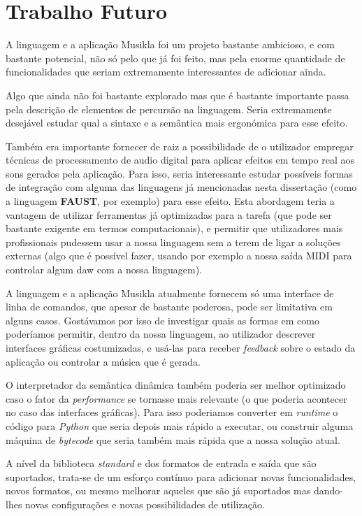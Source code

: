 \section{Trabalho Futuro}
A linguagem e a aplicação Musikla foi um projeto bastante ambicioso, e com bastante potencial, não só pelo que já foi feito, mas pela enorme quantidade de funcionalidades que seriam extremamente interessantes de adicionar ainda.

Algo que ainda não foi bastante explorado mas que é bastante importante passa pela descrição de elementos de percursão na linguagem. Seria extremamente desejável estudar qual a sintaxe e a semântica mais ergonómica para esse efeito.

Também era importante fornecer de raiz a possibilidade de o utilizador empregar técnicas de processamento de audio digital para aplicar efeitos em tempo real aos sons gerados pela aplicação. Para isso, seria interessante estudar possíveis formas de integração com alguma das linguagens já mencionadas nesta dissertação (como a linguagem \textbf{FAUST}, por exemplo) para esse efeito. Esta abordagem teria a vantagem de utilizar ferramentas já optimizadas para a tarefa (que pode ser bastante exigente em termos computacionais), e permitir que utilizadores mais profissionais pudessem usar a nossa linguagem sem a terem de ligar a soluções externas (algo que é possível fazer, usando por exemplo a nossa saída MIDI para controlar algum \acrfull{daw} com a nossa linguagem).

A linguagem e a aplicação Musikla atualmente fornecem só uma interface de linha de comandos, que apesar de bastante poderosa, pode ser limitativa em alguns casos. Gostávamos por isso de investigar quais as formas em como poderíamos permitir, dentro da nossa linguagem, ao utilizador descrever interfaces gráficas costumizadas, e usá-las para receber \textit{feedback} sobre o estado da aplicação ou controlar a música que é gerada.

O interpretador da semântica dinâmica também poderia ser melhor optimizado caso o fator da \textit{performance} se tornasse mais relevante (o que poderia acontecer no caso das interfaces gráficas). Para isso poderiamos converter em \textit{runtime} o código para \textit{Python} que seria depois mais rápido a executar, ou construir alguma máquina de \textit{bytecode} que seria também mais rápida que a nossa solução atual.

A nível da biblioteca \textit{standard} e dos formatos de entrada e saída que são suportados, trata-se de um esforço contínuo para adicionar novas funcionalidades, novos formatos, ou mesmo melhorar aqueles que são já suportados mas dando-lhes novas configurações e novas possibilidades de utilização.
